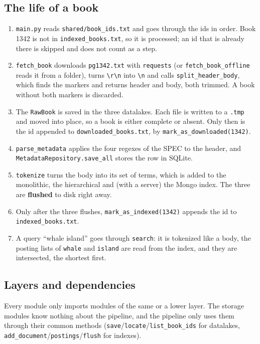 \documentclass[11pt,a4paper]{article}
\newcommand{\code}[1]{\texttt{#1}}
\begin{document}
\subsection{The life of a book}\label{sec:life}
\begin{enumerate}
  \item \code{main.py} reads \code{shared/book\_ids.txt} and goes through the ids in order. Book
        1342 is not in \code{indexed\_books.txt}, so it is processed; an id that is already there is
        skipped and does not count as a step.
  \item \code{fetch\_book} downloads \code{pg1342.txt} with \code{requests} (or
        \code{fetch\_book\_offline} reads it from a folder), turns \code{\textbackslash r\textbackslash n}
        into \code{\textbackslash n} and calls \code{split\_header\_body}, which finds the markers and
        returns header and body, both trimmed. A book without both markers is discarded.
  \item The \code{RawBook} is saved in the three datalakes. Each file is written to a \code{.tmp} and
        moved into place, so a book is either complete or absent. Only then is the id appended
        to \code{downloaded\_\allowbreak books.txt}, by
        \code{mark\_as\_\allowbreak downloaded(1342)}.
  \item \code{parse\_metadata} applies the four regexes of the SPEC to the header, and
        \code{MetadataRepository.\allowbreak save\_all} stores the row in SQLite.
  \item \code{tokenize} turns the body into its set of terms, which is added to the monolithic, the
        hierarchical and (with a server) the Mongo index. The three are \textbf{flushed} to disk
        right away.
  \item Only after the three flushes, \code{mark\_as\_indexed(1342)} appends the id to
        \code{indexed\_books.txt}.
  \item A query ``whale island'' goes through \code{search}: it is tokenized like a body, the
        posting lists of \code{whale} and \code{island} are read from the index, and they are
        intersected, the shortest first.
\end{enumerate}

\subsection{Layers and dependencies}
Every module only imports modules of the same or a lower layer. The storage modules know nothing
about the pipeline, and the pipeline only uses them through their common methods
(\code{save}/\code{locate}/\code{list\_book\_ids} for datalakes, \code{add\_document}/\code{postings}/\code{flush}
for indexes).
\end{document}
